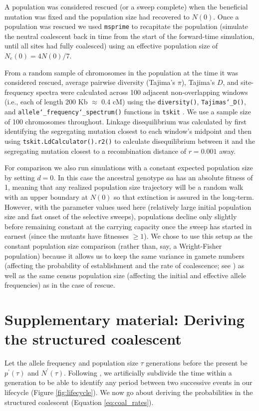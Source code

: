 \documentclass[]{article}
\begin{document}
A population was considered rescued (or a sweep complete) when the beneficial mutation was fixed and the population size had recovered to $N(0)$.
Once a population was rescued we used \texttt{msprime} \citep{kelleher2016efficient} to recapitate the population (simulate the neutral coalescent back in time from the start of the forward-time simulation, until all sites had fully coalesced) using an effective population size of $N_e(0)=4N(0)/7$.

From a random sample of chromosomes in the population at the time it was considered rescued, average pairwise diversity (Tajima's $\pi$), Tajima's $D$, and site-frequency spectra were calculated across 100 adjacent non-overlapping windows (i.e., each of length 200 Kb $\approx$ 0.4 cM) using the \texttt{diversity()}, \texttt{Tajimas\char`_D()}, and \texttt{allele\char`_frequency\char`_spectrum()} functions in \texttt{tskit} \cite[][]{kelleher2018efficient}.
We use a sample size of 100 chromosomes throughout.
Linkage disequilibrium was calculated by first identifying the segregating mutation closest to each window's midpoint and then using \texttt{tskit.LdCalculator().r2()} to calculate disequilibrium between it and the segregating mutation closest to a recombination distance of $r=0.001$ away.
 
For comparison we also run simulations with a constant expected population size by setting $d=0$.
In this case the ancestral genotype $aa$ has an absolute fitness of 1, meaning that any realized population size trajectory will be a random walk with an upper boundary at $N(0)$ so that extinction is assured in the long-term.  
However, with the parameter values used here (relatively large initial population size and fast onset of the selective sweeps), populations decline only slightly before remaining constant at the carrying capacity once the sweep has started in earnest (since the mutants have fitnesses $\geq 1$).
We chose to use this setup as the constant population size comparison (rather than, say, a Wright-Fisher population) because it allows us to keep the same variance in gamete numbers (affecting the probability of establishment and the rate of coalescence; see ) as well as the same census population size (affecting the initial and effective allele frequencies) as in the case of rescue.

\section*{Supplementary material: Deriving the structured coalescent}
\label{sec:derive_coalescent}
%
Let the allele frequency and population size $\tau$ generations before the present be $p^\prime(\tau)$ and $N^\prime(\tau)$.
Following \cite{pennings2006soft2}, we artificially subdivide the time within a generation to be able to identify any period between two successive events in our lifecycle (Figure \ref{fig:lifecycle}).
We now go about deriving the probabilities in the structured coalescent (Equation \ref{eq:coal_rates}).
%
\end{document}
